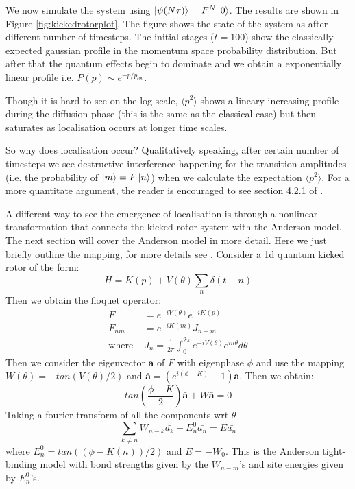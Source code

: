 \documentclass[twocolumn]{report}
\begin{document}
We now simulate the system using $\ket{\psi(N\tau)} = F^N \ket{0}$. The
results are shown in Figure \ref{fig:kickedrotorplot}. The figure shows the
state of the system as after different number of timesteps. The initial
stages ($t = 100$) show the classically expected gaussian profile in the
momentum space probability distribution. But after that the quantum effects
begin to dominate and we obtain a exponentially linear profile i.e. $P(p)
\sim e^{-p/p_{loc}}$.

Though it is hard to see on the log scale, $\langle p^2 \rangle$ shows a
lineary increasing profile during the diffusion phase (this is the same as
the classical case) but then saturates as localisation occurs at longer time
scales.

So why does localisation occur? Qualitatively speaking, after certain
number of timesteps we see destructive interference happening for
the transition amplitudes (i.e. the probability of $\ket{m} = F\ket{n}$)
when we calculate the expectation $\langle p^2 \rangle$. For a more
quantitate argument, the reader is encouraged to see section 4.2.1 of
\cite{stockmann}.

A different way to see the emergence of localisation is through a nonlinear
transformation that connects the kicked rotor system with the Anderson model.
The next section will cover the Anderson model in more detail. Here we just
briefly outline the mapping, for more details see \cite{stockmann}.
Consider a 1d quantum kicked rotor of the form:
\begin{equation}
    H = K(p) + V(\theta)\sum_{n} \delta(t - n)
\end{equation}
Then we obtain the floquet operator:
\begin{align}
    F &= e^{-iV(\theta)} e^{-iK(p)} \\
    F_{nm} &= e^{-iK(m)} J_{n-m} \\
    \text{where } & J_n = \frac{1}{2\pi} \int_0^{2\pi} e^{-iV(\theta)}
    e^{in\theta} d\theta
\end{align}
Then we consider the eigenvector $\mathbf{a}$ of $F$ with eigenphase $\phi$
and use the mapping $W(\theta) = -tan(V(\theta) / 2)$ and $\bar{\mathbf{a}}
= (e^{i(\phi - K)} + 1)\mathbf{a}$. Then we obtain:
\begin{equation}
    tan\left(\frac{\phi - K}{2}\right) \bar{\mathbf{a}} + W\bar{\mathbf{a}} = 0
\end{equation}
Taking a fourier transform of all the components wrt $\theta$
\begin{equation}
    \sum_{k \neq n} W_{n-k} \bar{a_k} + E^0_n \bar{a_n} = E \bar{a_n}
\end{equation}
where $E_n^0 = tan((\phi - K(n)) / 2)$ and $E = -W_0$. This is the Anderson
tight-binding model with bond strengths given by the $W_{n-m}$'s and site
energies given by $E^0_n$'s.
\end{document}
